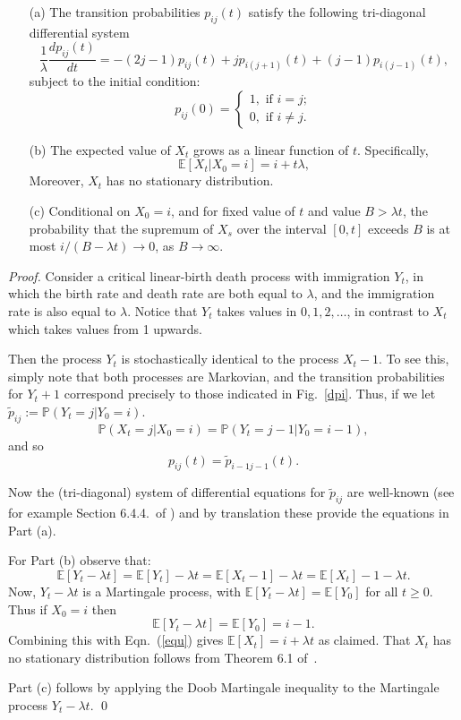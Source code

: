 \documentclass[runningheads, 11pt]{llncs}
\newcommand{\EE}{\mathbb{E}}
\newcommand{\PP}{\mathbb{P}}
\begin{document}
\begin{lemma}
\label{lem-central}
\mbox{}
\begin{itemize}
 \item[(a)] The transition probabilities $p_{ij}(t)$ satisfy the following
 tri-diagonal differential system
 $$ \frac{1}{\lambda}\frac{dp_{ij}(t)}{dt} = -(2j-1)p_{ij}(t) +
 jp_{i(j+1)}(t) +(j-1)p_{i(j-1)}(t),$$
 subject to the initial condition:
 $$p_{ij}(0) = 
 \begin{cases}
 1, \mbox{ if $i=j$}; \\
 0, \mbox{ if $i \neq j$}.
 \end{cases}
 $$
 \item[(b)] The expected value of $X_t$ grows as a linear function of $t$. Specifically,
 $$ \EE[X_t |X_0=i] = i+t \lambda, $$
 Moreover, $X_t$ has no stationary distribution. 
 \item[(c)] Conditional on $X_0=i$, and for fixed value of $t$ and value $B
 >\lambda t$, the probability that the supremum of $X_s$ over the
 interval $[0,t]$ exceeds $B$ is at most $i/(B-\lambda t) \rightarrow
 0$, as $B\rightarrow \infty$.
 \end{itemize}
\end{lemma} 

\begin{proof}

Consider a critical linear-birth death process with immigration $Y_t$, in which
the birth rate and death rate are both equal to $\lambda$, and the immigration
rate is also equal to $\lambda$. Notice that $Y_t$ takes values in $0, 1,2,
\ldots$, in contrast to $X_t$ which takes values from 1 upwards. 

Then the process $Y_t$ is stochastically identical to the process $X_t-1$. To
see this, simply note that both processes are Markovian, and the transition
probabilities for $Y_t+1$ correspond precisely to those indicated in
Fig.~\ref{dpi}. Thus, if we let $\tilde{p}_{ij} := \PP(Y_t =j|Y_0=i).$ $$\PP(X_t
=j|X_0=i) = \PP(Y_t = j-1|Y_0=i-1),$$ and so $$p_{ij}(t) =
\tilde{p}_{i-1j-1}(t). $$

\noindent Now the (tri-diagonal) system of differential equations for
$\tilde{p}_{ij}$ are well-known (see for example Section 6.4.4.\ of
\cite{Allen-book-2011}) and by translation these provide the equations in Part
(a).


For Part (b) observe that:
\begin{equation}
\label{equ}
\EE[Y_t-\lambda t] = \EE[Y_t]-\lambda t = \EE[X_t-1] - \lambda t = \EE[X_t] - 1-\lambda t.
\end{equation}
Now, $Y_t-\lambda t$ is a Martingale process, with $\EE[Y_t-\lambda t] =
\EE[Y_0]$ for all $t\geq 0$. Thus if $X_0=i$ then $$\EE[Y_t-\lambda t] =
\EE[Y_0] = i-1.$$ Combining this with Eqn.~(\ref{equ}) gives $\EE[X_t]= i+
\lambda t$ as claimed.
That $X_t$ has no stationary distribution follows from Theorem 6.1
of~\cite{Allen-book-2011}. 

Part (c) follows by applying the Doob Martingale inequality to the Martingale
process $Y_t-\lambda t$. \qed

\end{proof}
\end{document}
